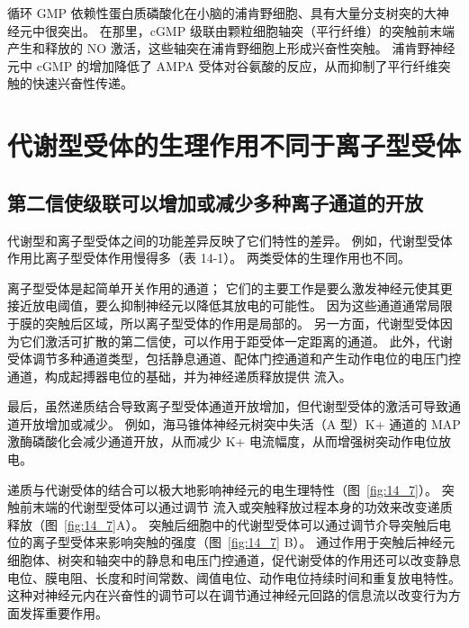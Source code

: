 循环 GMP 依赖性蛋白质磷酸化在小脑的浦肯野细胞、具有大量分支树突的大神经元中很突出。
在那里，cGMP 级联由颗粒细胞轴突（平行纤维）的突触前末端产生和释放的 NO 激活，这些轴突在浦肯野细胞上形成兴奋性突触。
浦肯野神经元中 cGMP 的增加降低了 AMPA 受体对谷氨酸的反应，从而抑制了平行纤维突触的快速兴奋性传递。



\section{代谢型受体的生理作用不同于离子型受体}

\subsection{第二信使级联可以增加或减少多种离子通道的开放}

代谢型和离子型受体之间的功能差异反映了它们特性的差异。
例如，代谢型受体作用比离子型受体作用慢得多（表 14-1）。
两类受体的生理作用也不同。


离子型受体是起简单开关作用的通道；
它们的主要工作是要么激发神经元使其更接近放电阈值，要么抑制神经元以降低其放电的可能性。
因为这些通道通常局限于膜的突触后区域，所以离子型受体的作用是局部的。
另一方面，代谢型受体因为它们激活可扩散的第二信使，可以作用于距受体一定距离的通道。
此外，代谢受体调节多种通道类型，包括静息通道、配体门控通道和产生动作电位的电压门控通道，构成起搏器电位的基础，并为神经递质释放提供  流入。


最后，虽然递质结合导致离子型受体通道开放增加，但代谢型受体的激活可导致通道开放增加或减少。
例如，海马锥体神经元树突中失活（A 型）K+ 通道的 MAP 激酶磷酸化会减少通道开放，从而减少 K+ 电流幅度，从而增强树突动作电位放电。


递质与代谢受体的结合可以极大地影响神经元的电生理特性（图~\ref{fig:14_7}）。
突触前末端的代谢型受体可以通过调节  流入或突触释放过程本身的功效来改变递质释放（图~\ref{fig:14_7}A）。
突触后细胞中的代谢型受体可以通过调节介导突触后电位的离子型受体来影响突触的强度（图~\ref{fig:14_7} B）。
通过作用于突触后神经元细胞体、树突和轴突中的静息和电压门控通道，促代谢受体的作用还可以改变静息电位、膜电阻、长度和时间常数、阈值电位、动作电位持续时间和重复放电特性。
这种对神经元内在兴奋性的调节可以在调节通过神经元回路的信息流以改变行为方面发挥重要作用。


